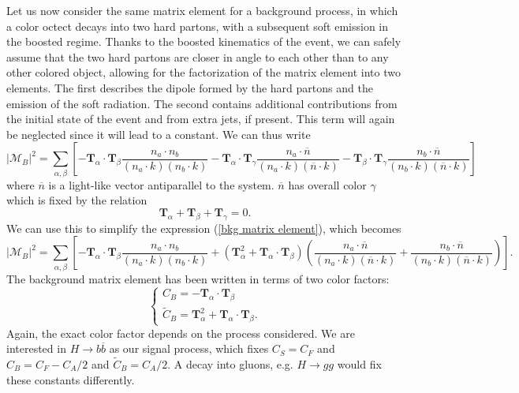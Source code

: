 \documentclass[10pt,a4paper]{book}
\begin{document}
Let us now consider the same matrix element for a background process, in which a color octect decays into two hard partons, with a subsequent soft emission in the boosted regime. Thanks to the boosted kinematics of the event, we can safely assume that the two hard partons are closer in angle to each other than to any other colored object, allowing for the factorization of the matrix element into two elements. The first describes the dipole formed by the hard partons and the emission of the soft radiation. The second contains additional contributions from the initial state of the event and from extra jets, if present. This term will again be neglected since it will lead to a constant. We can thus write
\begin{equation}
\vert \mathcal{M}_B \vert^2 = \sum_{\alpha, \beta} \left[ -\mathbf{T}_\alpha \cdot \mathbf{T}_\beta 	\frac{n_a \cdot n_b}{(n_a \cdot k)(n_b \cdot k)} - \mathbf{T}_\alpha \cdot \mathbf{T}_\gamma \frac{n_a \cdot \overline{n}}{(n_a \cdot k)(\overline{n} \cdot k)} - \mathbf{T}_\beta \cdot \mathbf{T}_\gamma 	\frac{n_b \cdot \overline{n}}{(n_b \cdot k)(\overline{n} \cdot k)} \right]
\label{bkg matrix element}
\end{equation}
where $\overline{n}$ is a light-like vector antiparallel to the system. $\overline{n}$ has overall color $\gamma$ which is fixed by the relation
\begin{equation}
\mathbf{T}_\alpha + \mathbf{T}_\beta + \mathbf{T}_\gamma = 0.
\end{equation}
We can use this to simplify the expression (\ref{bkg matrix element}), which becomes
\begin{equation}
\vert \mathcal{M}_B \vert^2 = \sum_{\alpha, \beta} \left[ -\mathbf{T}_\alpha \cdot \mathbf{T}_\beta 	\frac{n_a \cdot n_b}{(n_a \cdot k)(n_b \cdot k)} + (\mathbf{T}_\alpha^2 + \mathbf{T}_\alpha \cdot \mathbf{T}_\beta)\left(\frac{n_a \cdot \overline{n}}{(n_a \cdot k)(\overline{n} \cdot k)} + \frac{n_b \cdot \overline{n}}{(n_b \cdot k)(\overline{n} \cdot k)}\right) \right].
\end{equation}
The background matrix element has been written in terms of two color factors:
\begin{equation}
\begin{cases}
C_B = -\mathbf{T}_\alpha \cdot \mathbf{T}_\beta \\
\tilde{C}_B = \mathbf{T}_\alpha^2 + \mathbf{T}_\alpha \cdot \mathbf{T}_\beta.
\end{cases}
\end{equation}
Again, the exact color factor depends on the process considered. We are interested in $H\rightarrow b\overline{b}$ as our signal process, which fixes $C_S = C_F$ and $C_B = C_F - C_A/2$ and $\widetilde{C}_B = C_A/2$. A decay into gluons, e.g. $H\rightarrow gg$ would fix these constants differently.
\end{document}
